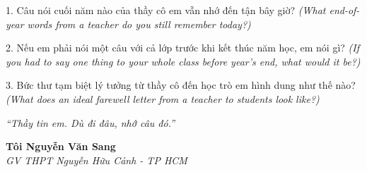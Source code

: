 \begin{tuhocnhanh}
1. Câu nói cuối năm nào của thầy cô em vẫn nhớ đến tận bây giờ? \textit{(What end-of-year words from a teacher do you still remember today?)}

2. Nếu em phải nói một câu với cả lớp trước khi kết thúc năm học, em nói gì? \textit{(If you had to say one thing to your whole class before year's end, what would it be?)}

3. Bức thư tạm biệt lý tưởng từ thầy cô đến học trò em hình dung như thế nào? \textit{(What does an ideal farewell letter from a teacher to students look like?)}
\end{tuhocnhanh}

\begin{center}
\textit{\color{softrose}``Thầy tin em. Dù đi đâu, nhớ câu đó.''}
\end{center}

\begin{flushright}
\textbf{Tôi Nguyễn Văn Sang}\\
\textit{GV THPT Nguyễn Hữu Cảnh - TP HCM}
\end{flushright}

\ngancach
